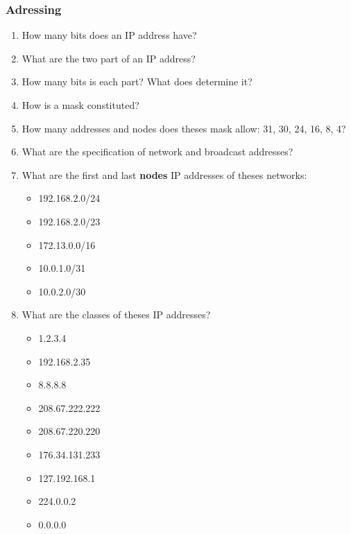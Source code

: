 \documentclass[11pt]{article}
\begin{document}
\subsubsection{Adressing}
\begin{enumerate}
  \item How many bits does an IP address have?
  \item What are the two part of an IP address?
  \item How many bits is each part? What does determine it?
  \item How is a mask constituted?
  \item How many addresses and nodes does theses mask allow: 31, 30, 24, 16, 8, 4?
  \item What are the specification of network and broadcast addresses?
  \item What are the first and last \textbf{nodes} IP addresses of theses networks:
    \begin{itemize}
      \item 192.168.2.0/24
      \item 192.168.2.0/23
      \item 172.13.0.0/16
      \item 10.0.1.0/31
      \item 10.0.2.0/30
    \end{itemize}
  \item What are the classes of theses IP addresses?
    \begin{itemize}
      \item 1.2.3.4
      \item 192.168.2.35
      \item 8.8.8.8
      \item 208.67.222.222
      \item 208.67.220.220
      \item 176.34.131.233
      \item 127.192.168.1
      \item 224.0.0.2
      \item 0.0.0.0
    \end{itemize}
\end{enumerate}
\end{document}
